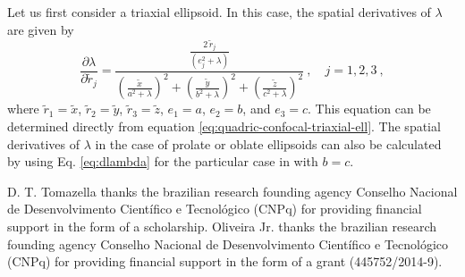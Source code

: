 \documentclass[gmd, manuscript]{copernicus}
\begin{document}
Let us first consider a triaxial ellipsoid. In this case,
the spatial derivatives of $\lambda$ are given by
\begin{equation}
\frac{\partial \lambda}{\partial \tilde{r}_{j}} =
\frac{\frac{2 \, \tilde{r}_{j}}{\left( e_{j}^{2} + \lambda \right)}}{
\left( \frac{\tilde{x}}{a^{2} + \lambda}\right)^{2} +
\left( \frac{\tilde{y}}{b^{2} + \lambda}\right)^{2} +
\left( \frac{\tilde{z}}{c^{2} + \lambda}\right)^{2}} \: , \quad j = 1, 2, 3 \: ,
\label{eq:dlambda}
\end{equation}
where
$\tilde{r}_{1} = \tilde{x}$, $\tilde{r}_{2} = \tilde{y}$, $\tilde{r}_{3} = \tilde{z}$,
$e_{1} = a$, $e_{2} = b$, and $e_{3} = c$.
This equation can be determined directly from equation
\ref{eq:quadric-confocal-triaxial-ell}.
The spatial derivatives of $\lambda$ in the case of
prolate or oblate ellipsoids can also be calculated by using
Eq. \ref{eq:dlambda} for the particular case in
with $b = c$.



\begin{acknowledgements}

D. T. Tomazella thanks the brazilian research founding agency
Conselho Nacional de
Desenvolvimento Cient\'{i}fico e Tecnol\'{o}gico (CNPq)
for providing financial support in the form of a scholarship.
Oliveira Jr. thanks the brazilian research founding agency
Conselho Nacional de Desenvolvimento Cient\'{i}fico e
Tecnol\'{o}gico (CNPq) for providing
financial support in the form of a grant (445752/2014-9).

\end{acknowledgements}










\end{document}
